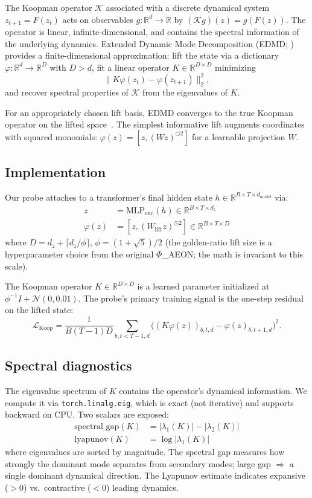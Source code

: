 \documentclass[11pt]{article}
\newcommand{\R}{\mathbb{R}}
\begin{document}
The Koopman operator $\mathcal{K}$ associated with a discrete dynamical
system $z_{t+1} = F(z_t)$ acts on observables $g: \R^d \to \R$ by
$(\mathcal{K} g)(z) = g(F(z))$. The operator is linear, infinite-dimensional,
and contains the spectral information of the underlying dynamics. Extended
Dynamic Mode Decomposition (EDMD; \citealp{williams2015data}) provides a
finite-dimensional approximation: lift the state via a dictionary
$\varphi: \R^d \to \R^D$ with $D > d$, fit a linear operator
$K \in \R^{D \times D}$ minimizing
\[
\| K \varphi(z_t) - \varphi(z_{t+1}) \|_2^2,
\]
and recover spectral properties of $\mathcal{K}$ from the eigenvalues of $K$.

For an appropriately chosen lift basis, EDMD converges to the true Koopman
operator on the lifted space~\citep{korda2018convergence}. The simplest
informative lift augments coordinates with squared monomials:
$\varphi(z) = [z, (Wz)^{\odot 2}]$ for a learnable projection $W$.

\subsection{Implementation}

Our probe attaches to a transformer's final hidden state $h \in \R^{B
\times T \times d_{\text{model}}}$ via:
\begin{align}
z &= \mathrm{MLP}_{\text{enc}}(h) \in \R^{B \times T \times d_z} \\
\varphi(z) &= [z, (W_{\text{lift}} z)^{\odot 2}] \in \R^{B \times T \times D}
\end{align}
where $D = d_z + \lceil d_z / \phi \rceil$, $\phi = (1 + \sqrt{5})/2$
(the golden-ratio lift size is a hyperparameter choice from the original
$\Phi$\_AEON; the math is invariant to this scale).

The Koopman operator $K \in \R^{D \times D}$ is a learned parameter
initialized at $\phi^{-1} I + \mathcal{N}(0, 0.01)$. The probe's primary
training signal is the one-step residual on the lifted state:
\[
\mathcal{L}_{\text{Koop}} = \frac{1}{B(T-1)D} \sum_{b, t < T-1, d}
\big( (K \varphi(z))_{b, t, d} - \varphi(z)_{b, t+1, d} \big)^2.
\]

\subsection{Spectral diagnostics}

The eigenvalue spectrum of $K$ contains the operator's dynamical
information. We compute it via \texttt{torch.linalg.eig}, which is exact
(not iterative) and supports backward on CPU. Two scalars are exposed:
\begin{align}
\text{spectral\_gap}(K) &= |\lambda_1(K)| - |\lambda_2(K)| \\
\text{lyapunov}(K)     &= \log |\lambda_1(K)|
\end{align}
where eigenvalues are sorted by magnitude. The spectral gap measures how
strongly the dominant mode separates from secondary modes; large gap
$\Rightarrow$ a single dominant dynamical direction. The Lyapunov estimate
indicates expansive ($>0$) vs.\ contractive ($<0$) leading dynamics.
\end{document}
